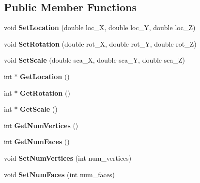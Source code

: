 \subsection*{Public Member Functions}
\begin{DoxyCompactItemize}
\item 
\mbox{\label{classobject_a049bf210513dcad8befc446b21bbe04e}} 
void {\bfseries Set\+Location} (double loc\+\_\+X, double loc\+\_\+Y, double loc\+\_\+Z)
\item 
\mbox{\label{classobject_a76a69357efa11fcc74550e98ada78be4}} 
void {\bfseries Set\+Rotation} (double rot\+\_\+X, double rot\+\_\+Y, double rot\+\_\+Z)
\item 
\mbox{\label{classobject_a3851ac40d2ece1b7773b473c6b0cbeb9}} 
void {\bfseries Set\+Scale} (double sca\+\_\+X, double sca\+\_\+Y, double sca\+\_\+Z)
\item 
\mbox{\label{classobject_a08fc87e448cd19e7b39063909b79335b}} 
int $\ast$ {\bfseries Get\+Location} ()
\item 
\mbox{\label{classobject_a963b5696150b7950c5103f8f5da316fc}} 
int $\ast$ {\bfseries Get\+Rotation} ()
\item 
\mbox{\label{classobject_a6b698fe06532b0311f9fac0d6c377076}} 
int $\ast$ {\bfseries Get\+Scale} ()
\item 
\mbox{\label{classobject_ac9e1f82f9673d009e293d2866bb12185}} 
int {\bfseries Get\+Num\+Vertices} ()
\item 
\mbox{\label{classobject_a55064bb9cec74c348aa9c6b63828c413}} 
int {\bfseries Get\+Num\+Faces} ()
\item 
\mbox{\label{classobject_acaf5c6b0f64d5044a487c6a89832b110}} 
void {\bfseries Set\+Num\+Vertices} (int num\+\_\+vertices)
\item 
\mbox{\label{classobject_a85014bdbe0bfa2558d806d7faa7219e6}} 
void {\bfseries Set\+Num\+Faces} (int num\+\_\+faces)
\item 
\mbox{\label{classobject_a4263222470132b9ff0bd23e981f6d15c}} 

\end{DoxyCompactItemize}
